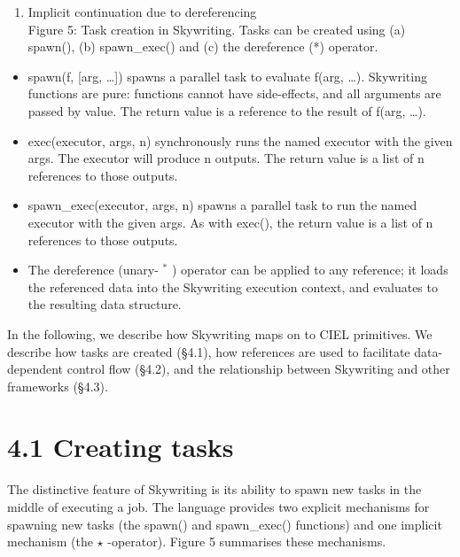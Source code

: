 \documentclass[
]{article}
\providecommand{\tightlist}{%
  \setlength{\itemsep}{0pt}\setlength{\parskip}{0pt}}
\begin{document}
\begin{enumerate}
\def\labelenumi{(\alph{enumi})}
\setcounter{enumi}{2}
\tightlist
\item
  Implicit continuation due to dereferencing\\
  Figure 5: Task creation in Skywriting. Tasks can be created using (a)
  spawn(), (b) spawn\_exec() and (c) the dereference (*) operator.
\end{enumerate}

\begin{itemize}
\tightlist
\item
  spawn(f, {[}arg, \ldots{]}) spawns a parallel task to evaluate f(arg,
  \ldots). Skywriting functions are pure: functions cannot have
  side-effects, and all arguments are passed by value. The return value
  is a reference to the result of f(arg, \ldots).\\
\item
  exec(executor, args, n) synchronously runs the named executor with the
  given args. The executor will produce n outputs. The return value is a
  list of n references to those outputs.\\
\item
  spawn\_exec(executor, args, n) spawns a parallel task to run the named
  executor with the given args. As with exec(), the return value is a
  list of n references to those outputs.\\
\item
  The dereference (unary- \(^{*}\) ) operator can be applied to any
  reference; it loads the referenced data into the Skywriting execution
  context, and evaluates to the resulting data structure.
\end{itemize}

In the following, we describe how Skywriting maps on to CIEL primitives.
We describe how tasks are created (§4.1), how references are used to
facilitate data-dependent control flow (§4.2), and the relationship
between Skywriting and other frameworks (§4.3).

\section{4.1 Creating tasks}\label{creating-tasks}

The distinctive feature of Skywriting is its ability to spawn new tasks
in the middle of executing a job. The language provides two explicit
mechanisms for spawning new tasks (the spawn() and spawn\_exec()
functions) and one implicit mechanism (the \(\star\) -operator). Figure
5 summarises these mechanisms.
\end{document}
